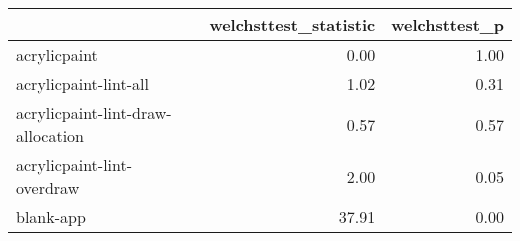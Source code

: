 \begin{tabular}{lrr}
\toprule
{} &  welchsttest\_statistic &  welchsttest\_p \\
\midrule
acrylicpaint                      &                   0.00 &           1.00 \\
acrylicpaint-lint-all             &                   1.02 &           0.31 \\
acrylicpaint-lint-draw-allocation &                   0.57 &           0.57 \\
acrylicpaint-lint-overdraw        &                   2.00 &           0.05 \\
blank-app                         &                  37.91 &           0.00 \\
\bottomrule
\end{tabular}
